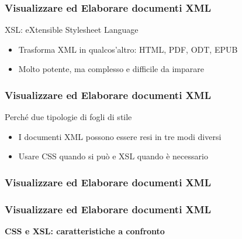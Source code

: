 \documentclass{beamer}
\begin{document}
    \begin{frame}
        \frametitle{Visualizzare ed Elaborare documenti XML}
        \addtocounter{nframe}{1}
        
        \begin{block}{XSL: eXtensible Stylesheet Language}
           
           \begin{itemize}
               \item Trasforma XML in qualcos'altro: HTML, PDF, ODT, EPUB
               \item Molto potente, ma complesso e difficile da imparare
           \end{itemize}
        \end{block}
        
    \end{frame}


    \begin{frame}
        \frametitle{Visualizzare ed Elaborare documenti XML}
        \addtocounter{nframe}{1}
        
        \begin{block}{Perché due tipologie di fogli di stile}
           
           \begin{itemize}
               \item I documenti XML possono essere resi in tre modi diversi
               \item Usare CSS quando si può e XSL quando è necessario
           \end{itemize}
        \end{block}
        
    \end{frame}


    \begin{frame}
        \frametitle{Visualizzare ed Elaborare documenti XML}
        \addtocounter{nframe}{1}
        
    
    \end{frame}


    \begin{frame}
        \frametitle{Visualizzare ed Elaborare documenti XML}
        \addtocounter{nframe}{1}
        \begin{center}
            \textbf{CSS e XSL: caratteristiche a confronto}
        \end{center}
       
    
    \end{frame}
\end{document}
